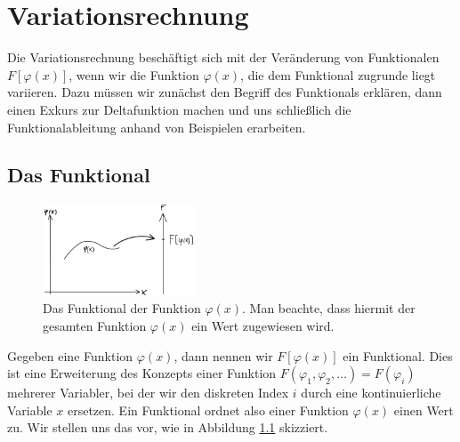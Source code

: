 \chapter{Variationsrechnung}\label{chap:Variationsrechnung}
Die Variationsrechnung beschäftigt sich mit der Veränderung von Funktionalen
$F[\varphi(x)]$, wenn wir die Funktion $\varphi(x)$, die dem Funktional
zugrunde liegt variieren. Dazu müssen wir zunächst den Begriff des
Funktionals erklären, dann einen Exkurs zur Deltafunktion machen und uns
schließlich die Funktionalableitung anhand von Beispielen erarbeiten. 

\section{Das Funktional}\label{sec:DasFunktional}
\begin{figure}
 \begin{center}
  \includegraphics[width=0.4\textwidth]{fig/Funktional.png}
  \caption{Das Funktional der Funktion $\varphi(x)$. Man beachte, dass hiermit
  der gesamten Funktion $\varphi(x)$ ein Wert zugewiesen
  wird.\label{fig:functional}}
 \end{center}
\end{figure}
Gegeben eine Funktion $\varphi(x)$, dann nennen wir $F[\varphi(x)]$ ein
Funktional. Dies ist eine Erweiterung des Konzepts einer Funktion
$F(\varphi_1,\varphi_2,\dots)=F(\varphi_i)$ mehrerer Variabler, bei der wir den
diskreten Index $i$ durch eine kontinuierliche Variable $x$ ersetzen. Ein
Funktional ordnet also einer Funktion $\varphi(x)$ einen Wert zu. Wir stellen
uns das vor, wie in Abbildung \ref{fig:functional} skizziert.\\
\\
\\
\\
\\
\\
\\
\\
\\

